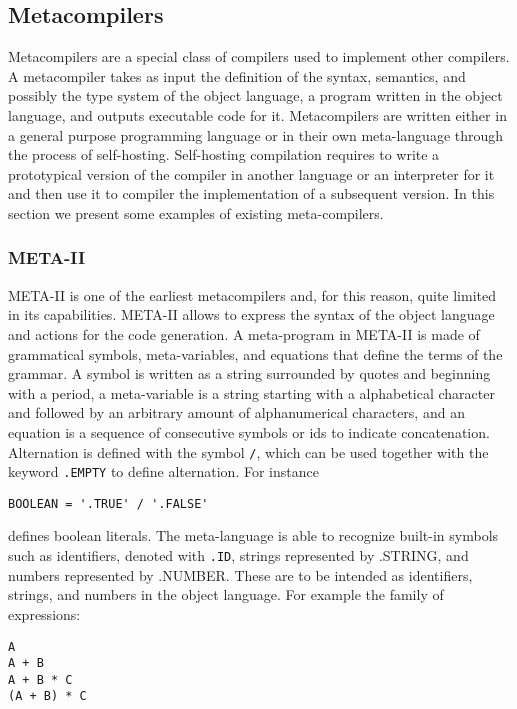 \subsection{Metacompilers}
Metacompilers are a special class of compilers used to implement other compilers. A metacompiler takes as input the definition of the syntax, semantics, and possibly the type system of the object language, a program written in the object language, and outputs executable code for it. Metacompilers are written either in a general purpose programming language or in their own meta-language through the process of self-hosting. Self-hosting compilation requires to write a prototypical version of the compiler in another language or an interpreter for it and then use it to compiler the implementation of a subsequent version. In this section we present some examples of existing meta-compilers.

\subsubsection{META-II}
META-II is one of the earliest metacompilers and, for this reason, quite limited in its capabilities. META-II allows to express the syntax of the object language and actions for the code generation. A meta-program in META-II is made of grammatical symbols, meta-variables, and equations that define the terms of the grammar. A symbol is written as a string surrounded by quotes and beginning with a period, a meta-variable is a string starting with a alphabetical character and followed by an arbitrary amount of alphanumerical characters, and an equation is a sequence of consecutive symbols or ids to indicate concatenation. Alternation is defined with the symbol \texttt{/}, which can be used together with the keyword \texttt{.EMPTY} to define alternation. For instance

\begin{lstlisting}
BOOLEAN = '.TRUE' / '.FALSE'
\end{lstlisting}

\noindent
defines boolean literals. The meta-language is able to recognize built-in symbols such as identifiers, denoted with \texttt{.ID}, strings represented by .STRING, and numbers represented by .NUMBER. These are to be intended as identifiers, strings, and numbers in the object language. For example the family of expressions:

\begin{lstlisting}
A
A + B
A + B * C
(A + B) * C
\end{lstlisting}

